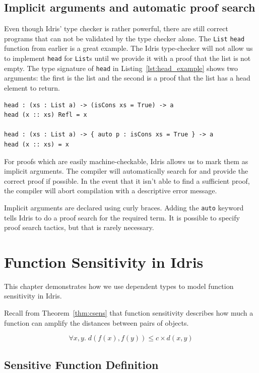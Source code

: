\documentclass[12pt]{report}
\begin{document}
\section{Implicit arguments and automatic proof search}

Even though Idris' type checker is rather powerful, there are still correct programs that can not be validated by the type checker alone.
The \texttt{List} \lstinline{head} function from earlier is a great example.
The Idris type-checker will not allow us to implement \texttt{head} for \texttt{List}s until we provide it with a proof that the list is not empty.
The type signature of \texttt{head} in Listing~\ref{lst:head_example} shows two arguments: the first is the list and the second is a proof that the list has a head element to return.

\begin{lstlisting}[float,caption={Taking the head of a list},label={lst:head_example}]
head : (xs : List a) -> (isCons xs = True) -> a
head (x :: xs) Refl = x

head : (xs : List a) -> { auto p : isCons xs = True } -> a
head (x :: xs) = x
\end{lstlisting}

For proofs which are easily machine-checkable, Idris allows us to mark them as implicit arguments.
The compiler will automatically search for and provide the correct proof if possible.
In the event that it isn't able to find a sufficient proof, the compiler will abort compilation with a descriptive error message.

Implicit arguments are declared using curly braces.
Adding the \texttt{auto} keyword tells Idris to do a proof search for the required term.
It is possible to specify proof search tactics, but that is rarely necessary.

\chapter{Function Sensitivity in Idris}\label{sec:function_sensitivity}

This chapter demonstrates how we use dependent types to model function sensitivity in Idris.

Recall from Theorem~\ref{thm:csens} that function sensitivity describes how much a function can amplify the distances between pairs of objects.

$$ \forall x,y.\; d(f(x),f(y)) \le c \times d(x,y) $$

\section{Sensitive Function Definition}
\end{document}
